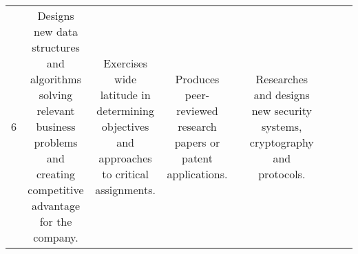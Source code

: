 \documentclass{article}
\begin{document}
{\begin{tabular}{|C|C|C|C|C|C|C|C|C|}
    \\ [13em]
  \hline
    6
    &

    Designs new data structures and algorithms solving relevant business
    problems and creating competitive advantage for the company.
    &

    Exercises wide latitude in determining objectives and approaches to critical
    assignments.
    &

    Produces peer-reviewed research papers or patent applications.
    &

    &

    Researches and designs new security systems, cryptography and protocols.
    &

    &

    &

    \\ [12em]
\end{tabular}

}
\end{document}
